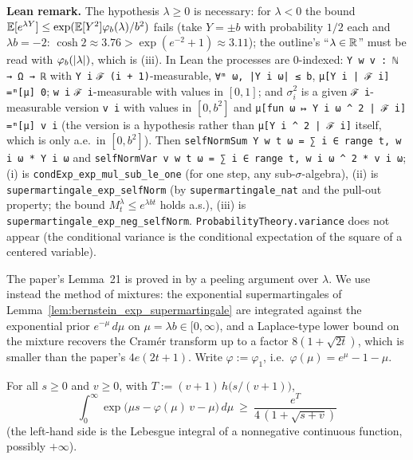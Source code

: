 \textbf{Lean remark.} The hypothesis $\lambda \ge 0$ is necessary: for $\lambda < 0$ the bound
$\mathbb{E}[e^{\lambda Y}] \le \exp(\mathbb{E}[Y^2]\varphi_b(\lambda)/b^2)$ fails (take $Y = \pm b$ with probability
$1/2$ each and $\lambda b = -2$: $\cosh 2 \approx 3.76 > \exp(e^{-2} + 1) \approx 3.11$); the
outline's ``$\lambda \in \mathbb{R}$'' must be read with $\varphi_b(\lvert \lambda \rvert)$, which is (iii). In Lean
the processes are $0$-indexed: \texttt{Y w v : ℕ → Ω → ℝ} with \texttt{Y i}
\texttt{ℱ (i + 1)}-measurable, \texttt{∀ᵐ ω, |Y i ω| ≤ b}, \texttt{μ[Y i | ℱ i] =ᵐ[μ] 0};
\texttt{w i} \texttt{ℱ i}-measurable with values in $[0, 1]$; and $\sigma_i^2$ is a given
\texttt{ℱ i}-measurable version \texttt{v i} with values in $[0, b^2]$ and
\texttt{μ[fun ω ↦ Y i ω \^{} 2 | ℱ i] =ᵐ[μ] v i} (the version is a hypothesis rather than
\texttt{μ[Y i \^{} 2 | ℱ i]} itself, which is only a.e.\ in $[0, b^2]$). Then
\texttt{selfNormSum Y w t ω = ∑ i ∈ range t, w i ω * Y i ω} and
\texttt{selfNormVar v w t ω = ∑ i ∈ range t, w i ω \^{} 2 * v i ω}; (i) is
\texttt{condExp\_exp\_mul\_sub\_le\_one} (for one step, any sub-$\sigma$-algebra), (ii) is
\texttt{supermartingale\_exp\_selfNorm} (by \texttt{supermartingale\_nat} and the pull-out property;
the bound $M^\lambda_t \le e^{\lambda b t}$ holds a.s.), (iii) is
\texttt{supermartingale\_exp\_neg\_selfNorm}. \texttt{ProbabilityTheory.variance} does not appear
(the conditional variance is the conditional expectation of the square of a centered variable).

The paper's Lemma~21 is proved in \cite{menard2021fast} by a peeling argument over
$\lambda$. We use instead the method of mixtures: the exponential supermartingales of
Lemma~\ref{lem:bernstein_exp_supermartingale} are integrated against the exponential prior
$e^{-\mu}\,d\mu$ on $\mu = \lambda b \in [0, \infty)$, and a Laplace-type lower bound on the
mixture recovers the Cramér transform up to a factor $8(1 + \sqrt{2t})$, which is smaller than the
paper's $4e(2t + 1)$. Write $\varphi := \varphi_1$, i.e.\ $\varphi(\mu) = e^\mu - 1 - \mu$.

\begin{lemma}\label{lem:pconc_mixture_lower}
\leanok
For all $s \ge 0$ and $v \ge 0$, with $T := (v + 1)\, h\big(s/(v + 1)\big)$,
\[
  \int_0^\infty \exp\big(\mu s - \varphi(\mu)\, v - \mu\big)\, d\mu \ \ge\ \frac{e^{T}}{4\,(1 + \sqrt{s + v})}
\]
(the left-hand side is the Lebesgue integral of a nonnegative continuous function, possibly $+\infty$).
\end{lemma}

